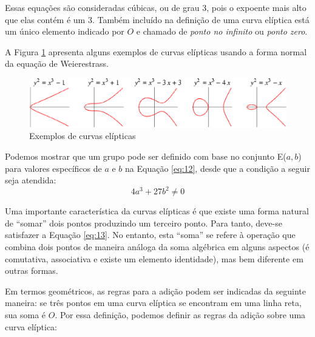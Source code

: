 Essas equações são consideradas cúbicas, ou de grau 3, pois o expoente mais alto que elas contém é um 3. Também incluído na definição de uma curva elíptica está um único elemento indicado por \(O\) e chamado de \textit{ponto no infinito} ou \textit{ponto zero}.

A Figura \ref{fig:curvas} apresenta alguns exemplos de curvas elípticas usando a forma normal da equação de Weierestrass.

\begin{figure}[h]
\centering
\includegraphics[scale=0.5, bb=0 0 529 101]{figuras/curvas.eps}
\caption{Exemplos de curvas elípticas}
\label{fig:curvas}
\end{figure}


Podemos mostrar que um grupo pode ser definido com base no conjunto E(\(a, b\)) para valores específicos de \(a\) e \(b\) na Equação \ref{eq:12}, desde que a condição a seguir seja atendida:
\begin{equation}
4a^3 + 27b^2 \neq 0 \label{eq:13}
\end{equation}

Uma importante característica da curvas elípticas é que existe uma forma natural de ``somar'' dois pontos produzindo um terceiro ponto. Para tanto, deve-se satisfazer a Equação \ref{eq:13}. No entanto, esta ``soma'' se refere à operação que combina dois pontos de maneira análoga da soma algébrica em alguns aspectos (é comutativa, associativa e existe um elemento identidade), mas bem diferente em outras formas.

Em termos geométricos, as regras para a adição podem ser indicadas da seguinte maneira: se três pontos em uma curva elíptica se encontram em uma linha reta, sua soma é \(O\). Por essa definição, podemos definir as regras da adição sobre uma curva elíptica:

